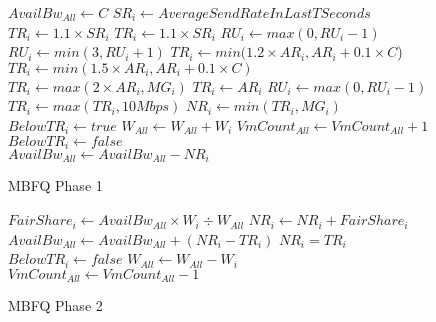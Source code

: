 \begin{figure}[t]
{\footnotesize
\begin{algorithmic}[1]
\State $AvailBw_{All} \gets C$
\State $SR_{i} \gets AverageSendRateInLastTSeconds$
\State $TR_{i} \gets 1.1 \times SR_{i}$
\State $TR_{i} \gets 1.1 \times SR_{i}$ 
\State $RU_{i} \gets max(0, RU_{i}-1)$
\State $RU_{i} \gets min(3, RU_{i} + 1)$
\State $TR_{i} \gets min(1.2 \times AR_{i}, AR_{i} + 0.1 \times C$)
\State $TR_{i} \gets min(1.5 \times AR_{i}, AR_{i} + 0.1 \times C)$
\State $TR_{i} \gets max(2 \times AR_{i}, MG_{i})$
\EndIf
\Else
\State $TR_{i} \gets AR_{i}$
\State $RU_{i} \gets max(0, RU_{i} - 1)$
\EndIf
\\
\State $TR_{i} \gets max(TR_{i}, 10Mbps)$
\State $NR_{i} \gets min(TR_{i}, MG_{i})$
\\
\State $BelowTR_{i} \gets true$
\State $W_{All} \gets W_{All} + W_{i}$
\State $VmCount_{All} \gets VmCount_{All} + 1$
\Else
\State $BelowTR_{i} \gets false$
\EndIf
\\
\State $AvailBw_{All} \gets AvailBw_{All} - NR_{i}$
\EndFor
\end{algorithmic}
}
\vspace{-0.5em}
\caption{MBFQ Phase 1}
\label{fig:mbfq_p1}
\vspace{-2em}
\end{figure}

\begin{figure}[t]
{\footnotesize
\begin{algorithmic}[1]
\State $FairShare_{i} \gets AvailBw_{All} \times W_{i} \div W_{All}$
\State $NR_{i} \gets NR_{i} + FairShare_{i}$
\EndIf
\\
\State $AvailBw_{All} \gets AvailBw_{All} + (NR_{i} - TR_{i})$
\State $NR_{i} = TR_{i}$
\State $BelowTR_{i} \gets false$
\State $W_{All} \gets W_{All} - W_{i}$
\State $VmCount_{All} \gets VmCount_{All} - 1$
\EndIf
\EndFor
\EndWhile
\end{algorithmic}
}
\vspace{-0.5em}
\caption{MBFQ Phase 2}
\label{fig:mbfq_p2}
\vspace{-1em}
\end{figure}

